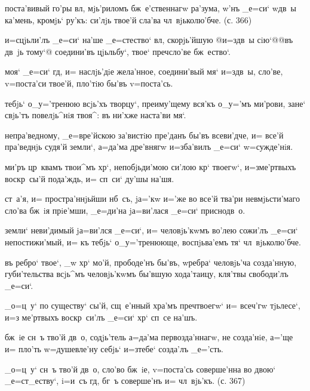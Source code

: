 {{ поста'вивый го'ры вл, мjь'риломъ 
бж~е'ственнагw ра'зума, w'нъ _е=си` w\т дв~ы 
ка'мень, кромjь` ру'къ: си'лjь твое'й сла'ва 
чл~вjьколю'бче. (с. 366)

 и=сцjьли'лъ _е=си` на'ше _е=стество` 
вл, скорjь'йшую @и=з\ъ дв~ы сiю`@{@въ дв~jь тому`@} 
соедини'въ цjьльбу`, твое` преч сло'ве бж~ество`.

 моя` _е=си` гд, и= наслjь'дiе жела'нное, 
соедини'вый мя` и=з\ъ дв~ы, сло'ве, v=поста'си твое'й, 
пло'тiю бы'въ v=поста'сь.


  тебjь` о_у='тренюю всjь'хъ творцу`, 
преиму'щему вся'къ о_у='мъ ми'рови, зане` свjь'тъ 
повелjь^нiя твоя^: въ ни'хже наста'ви мя`.

 непра'ведному, _е=вре'йскою за'вистiю 
пре'данъ бы'въ всеви'дче, и= все'й пра'веднjь судя'й 
земли`, а=да'ма дре'внягw и=зба'вилъ _е=си` w=сужде'нiя.

 ми'ръ цр~квамъ твои^мъ хр`, 
непобjьди'мою си'лою кр` твоегw`, и=з\ъ ме'ртвыхъ 
воскр~сы'й пода'ждь, и= сп~си` ду'шы на'шя.

  ст~а'я, и= простра'ннjьйши 
нб~съ, jа='кw и='же во все'й тва'ри невмjьсти'маго сло'ва 
бж~iя прiе'мши, _е=ди'на jа=ви'лася _е=си` приснодв~о.


  земли` неви'димый jа=ви'лся _е=си`, 
и= человjь'кwмъ во'лею сожи'лъ _е=си` непостижи'мый, и= 
къ тебjь` о_у='тренююще, воспjьва'емъ тя` чл~вjьколю'бче.

 въ ребро` твое`, _w хр` мо'й, 
прободе'нъ бы'въ, w\т ребра` человjь'ча созда'нную, 
губи'тельства всjь^мъ человjь'кwмъ бы'вшую хода'таицу, 
кля'твы свободи'лъ _е=си`.

 _о=ц~у` по существу` сы'й, сщ~е'нный 
хра'мъ преч твоегw` и= всеч'гw тjьлесе`, и=з\ъ 
ме'ртвыхъ воскр~си'лъ _е=си` хр` сп~се на'шъ.


 бж~iе сн~ъ тво'й дв~о, содjь'тель а=да'ма 
первозда'ннагw, не созда'нiе, а='ще и= пло'ть 
w=душевле'ну себjь` и=з\ъ тебе` созда'лъ _е='сть.

 _о=ц~у` сн~ъ тво'й дв~о, сло'во бж~iе, 
v=поста'сь соверше'нна во двою` _е=ст_еству`, i=и~съ 
гд, бг~ъ соверше'нъ и= чл~вjь'къ. (с. 367)

}}
